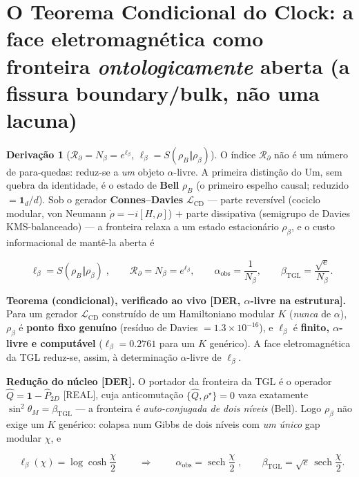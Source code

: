 \documentclass[11pt]{article}
\newcommand{\bTGL}{\beta_{\mathrm{TGL}}}\newcommand{\Msun}{M_{\odot}}\newcommand{\TGL}{\mathrm{TGL}}
\theoremstyle{definition}\newtheorem{deriv}{Derivação}
\begin{document}
\section{O Teorema Condicional do Clock: a face eletromagnética como fronteira \emph{ontologicamente} aberta (a fissura boundary/bulk, não uma lacuna)}

\begin{deriv}[$\mathcal{R}_\partial=N_\beta=e^{\ell_\beta}$, $\ell_\beta=S(\rho_B\Vert\rho_\beta)$]

O índice $\mathcal{R}_\partial$ não é um número de para-quedas: reduz-se a \emph{um} objeto $\alpha$-livre. A primeira distinção do Um, sem quebra da identidade, é o estado de \textbf{Bell} $\rho_B$ (o primeiro espelho causal; reduzido $=\mathbf 1_d/d$). Sob o gerador \textbf{Connes--Davies} $\mathcal{L}_{\mathrm{CD}}$ --- parte reversível (cociclo modular, von Neumann $\dot\rho=-i[H,\rho]$) $+$ parte dissipativa (semigrupo de Davies KMS-balanceado) --- a fronteira relaxa a um estado estacionário $\rho_\beta$, e o custo informacional de mantê-la aberta é

\begin{equation}\boxed{\;\ell_\beta=S(\rho_B\Vert\rho_\beta)\;},\qquad \mathcal{R}_\partial=N_\beta=e^{\ell_\beta},\qquad \alpha_{\mathrm{obs}}=\frac{1}{N_\beta},\qquad \bTGL=\frac{\sqrt e}{N_\beta}.\end{equation}

\textbf{Teorema (condicional), verificado ao vivo \textsf{[DER, $\alpha$-livre na estrutura]}.} Para um gerador $\mathcal{L}_{\mathrm{CD}}$ construído de um Hamiltoniano modular $K$ (\emph{nunca} de $\alpha$), $\rho_\beta$ é \textbf{ponto fixo genuíno} (resíduo de Davies $=1.3\times10^{-16}$), e $\ell_\beta$ é \textbf{finito, $\alpha$-livre e computável} ($\ell_\beta=0.2761$ para um $K$ genérico). A face eletromagnética da TGL reduz-se, assim, à determinação $\alpha$-livre de $\ell_\beta$.

\textbf{Redução do núcleo \textsf{[DER]}.} O portador da fronteira da TGL é o operador $\hat Q=\mathbf 1-\hat P_{2D}$ \textsf{[REAL]}, cuja anticomutação $\{\hat Q,\rho^\star\}=0$ vaza exatamente $\sin^2\theta_M=\bTGL$ --- a fronteira é \emph{auto-conjugada de dois níveis} (Bell). Logo $\rho_\beta$ não exige um $K$ genérico: colapsa num Gibbs de dois níveis com \emph{um único} gap modular $\chi$, e

\begin{equation}\boxed{\;\ell_\beta(\chi)=\log\cosh\frac{\chi}{2}\;}\qquad\Longrightarrow\qquad\boxed{\;\alpha_{\mathrm{obs}}=\operatorname{sech}\frac{\chi}{2}\;},\qquad \bTGL=\sqrt e\,\operatorname{sech}\frac{\chi}{2}.\end{equation}


\end{deriv}
\end{document}

